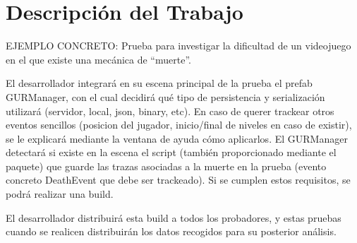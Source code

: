 \chapter{Descripción del Trabajo}
\label{cap:descripcionTrabajo}
EJEMPLO CONCRETO: Prueba para investigar la dificultad de un videojuego en el que existe una mecánica de “muerte”.


El desarrollador integrará en su escena principal de la prueba el prefab GURManager, con el cual decidirá qué tipo de persistencia y serialización utilizará (servidor, local, json, binary, etc). En caso de querer trackear otros eventos sencillos (posicion del jugador, inicio/final de niveles en caso de existir), se le explicará mediante la ventana de ayuda cómo aplicarlos. El GURManager detectará si existe en la escena el script (también proporcionado mediante el paquete) que guarde las trazas asociadas a la muerte en la prueba (evento concreto DeathEvent que debe ser trackeado). Si se cumplen estos requisitos, se podrá realizar una build. 


El desarrollador distribuirá esta build a todos los probadores, y estas pruebas cuando se realicen distribuirán los datos recogidos para su posterior análisis.




